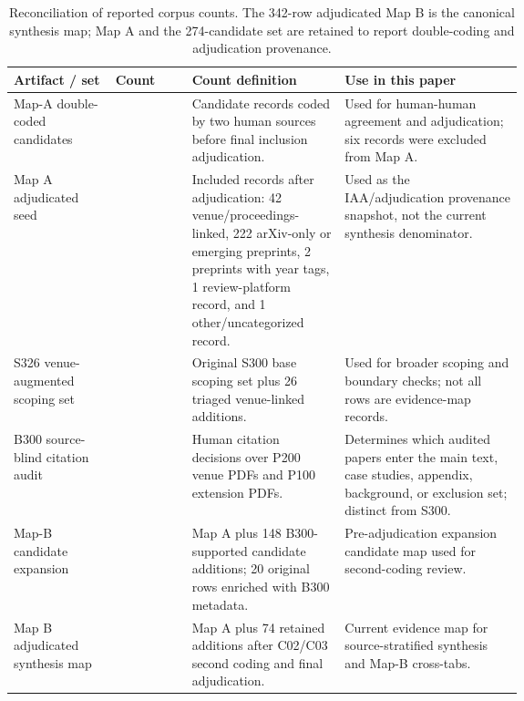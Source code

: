 \documentclass[11pt]{article}
\begin{document}

\begin{table}[t]
\centering
\scriptsize
\renewcommand{\arraystretch}{0.92}
\begin{tabularx}{\linewidth}{>{\raggedright\arraybackslash}p{0.20\linewidth}>{\raggedright\arraybackslash}p{0.15\linewidth}>{\raggedright\arraybackslash}p{0.30\linewidth}X}
\toprule
\textbf{Artifact / set} & \textbf{Count} & \textbf{Count definition} & \textbf{Use in this paper} \\
\midrule
Map-A double-coded candidates & 274 & Candidate records coded by two human sources before final inclusion adjudication. & Used for human-human agreement and adjudication; six records were excluded from Map A. \\
Map A adjudicated seed & 268 & Included records after adjudication: 42 venue/proceedings-linked, 222 arXiv-only or emerging preprints, 2 preprints with year tags, 1 review-platform record, and 1 other/uncategorized record. & Used as the IAA/adjudication provenance snapshot, not the current synthesis denominator. \\
S326 venue-augmented scoping set & 326 & Original S300 base scoping set plus 26 triaged venue-linked additions. & Used for broader scoping and boundary checks; not all rows are evidence-map records. \\
B300 source-blind citation audit & 300 & Human citation decisions over P200 venue PDFs and P100 extension PDFs. & Determines which audited papers enter the main text, case studies, appendix, background, or exclusion set; distinct from S300. \\
Map-B candidate expansion & 416 & Map A plus 148 B300-supported candidate additions; 20 original rows enriched with B300 metadata. & Pre-adjudication expansion candidate map used for second-coding review. \\
Map B adjudicated synthesis map & 342 & Map A plus 74 retained additions after C02/C03 second coding and final adjudication. & Current evidence map for source-stratified synthesis and Map-B cross-tabs. \\
\bottomrule
\end{tabularx}
\caption{Reconciliation of reported corpus counts. The 342-row adjudicated Map B is the canonical synthesis map; Map A and the 274-candidate set are retained to report double-coding and adjudication provenance.}
\label{tab:source-strata-reconciliation}
\end{table}
\end{document}
